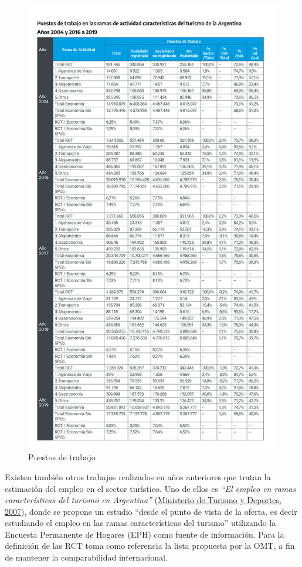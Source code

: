 \documentclass[
  openany]{book}
\begin{document}
\begin{figure}

{\centering \includegraphics[width=1\linewidth]{imagenes/figura2.2} 

}

\caption{Puestos de trabajo}\label{fig:emit}
\end{figure}

Existen también otros trabajos realizados en años anteriores que tratan la estimación del empleo en el sector turístico. Uno de ellos es \emph{``El empleo en ramas características del turismo en Argentina''} (\protect\hyperlink{ref-mintur2007}{Ministerio de Turismo y Deportes, 2007}), donde se propone un estudio ``desde el punto de vista de la oferta, es decir estudiando el empleo en las ramas características del turismo'' utilizando la Encuesta Permanente de Hogares (EPH) como fuente de información. Para la definición de las RCT toma como referencia la lista propuesta por la OMT, a fin de mantener la comparabilidad internacional.
\end{document}

